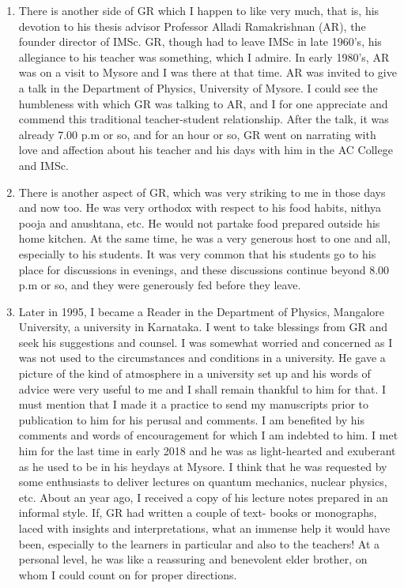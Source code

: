 \begin{enumerate}
\item There is another side of GR which I happen to like very much, that is, his devotion to his thesis advisor Professor Alladi Ramakrishnan (AR), the founder director of IMSc. GR, though had to leave IMSc in late 1960's, his allegiance to his teacher was something, which I admire. In early 1980's, AR was on a visit to Mysore and I was there at that time. AR was invited to give a talk in the Department of Physics, University of Mysore. I could see the humbleness with which GR was talking to AR, and I for one appreciate and commend this traditional teacher-student relationship. After the talk, it was already 7.00 p.m or so, and for an hour or so, GR went on narrating with love and affection about his teacher and his days with him in the AC College and IMSc.
\item There is another aspect of GR, which was very striking to me in those days and now too. He was very orthodox with respect to his food habits, nithya pooja and anushtana, etc. He would not partake food prepared outside his home kitchen. At the same time, he was a very generous host to one and all, especially to his students. It was very common that his students go to his place for discussions in evenings, and these discussions continue beyond 8.00 p.m or so, and they were generously fed before they leave.
\item Later in 1995, I became a Reader in the Department of Physics, Mangalore University, a university in Karnataka. I went to take blessings from GR and seek his suggestions and counsel. I was somewhat worried and concerned as I was not used to the circumstances and conditions in a university. He gave a picture of the kind of atmosphere in a university set up and his words of advice were very useful to me and I shall remain thankful to him for that. I must mention that I made it a practice to send my manuscripts prior to publication to him for his perusal and comments. I am benefited by his comments and words of encouragement for which I am indebted to him. I met him for the last time in early 2018 and he was as light-hearted and exuberant as he used to be in his heydays at Mysore. I think that he was requested by some enthusiasts to deliver lectures on quantum mechanics, nuclear physics, etc. About an year ago, I received a copy of his lecture notes prepared in an informal style. If, GR had written a couple of text- books or monographs, laced with insights and interpretations, what an immense help it would have been, especially to the learners in particular and also to the teachers! At a personal level, he was like a reassuring and benevolent elder brother, on whom I could count on for proper directions.
\end{enumerate}

